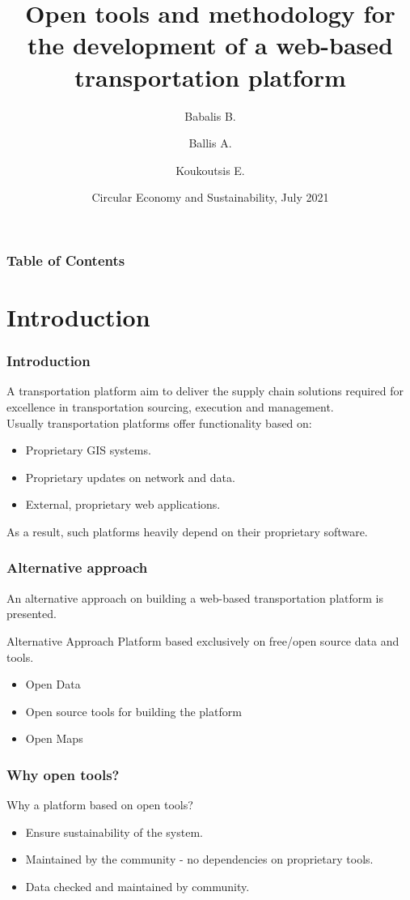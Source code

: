 \documentclass{beamer}
\title{Open tools and methodology for the development of a web-based transportation platform}
\author[Babalis B., Ballis A., Koukoutsis E.] %
{Babalis B.\inst{1} \and Ballis A.\inst{2} \and Koukoutsis E.\inst{1}}
\institute[National Technical University of Athens] %
{
  \inst{1}%
  School of Electrical and Computer Engineering\\
  National Technical University of Athens
  \and
  \inst{2}%
  School of Civil Engineering\\
  National Technical University of Athens
}
\date[CES 2021] %
{Circular Economy and Sustainability, July 2021}
\begin{document}
\frame{\titlepage}

\begin{frame}
	\frametitle{Table of Contents}
	\tableofcontents
\end{frame}

\section{Introduction}
    \begin{frame}
    \frametitle{Introduction}
    A transportation platform aim to deliver the supply chain solutions required for excellence in transportation sourcing, execution and management.\\
    Usually transportation platforms offer functionality based on:
    \begin{itemize}
    	\item Proprietary GIS systems.
    	\item Proprietary updates on network and data.
    	\item External, proprietary web applications.
    \end{itemize}
    \pause
    \checkmark As a result, such platforms heavily depend on their proprietary software.
    \end{frame}
    
    \begin{frame}
    \frametitle{Alternative approach}
    
    An alternative approach on building a web-based transportation platform is presented.
    \begin{block}{Alternative Approach}
    Platform based exclusively on free/open source data and tools.
	\end{block}

    \pause
    \begin{itemize}
        \item Open Data
        \item Open source tools for building the platform
        \item Open Maps
    \end{itemize}
    \end{frame}
    
    \begin{frame}
    \frametitle{Why open tools?}
    Why a platform based on open tools?
    
    \begin{itemize}
        \item Ensure sustainability of the system.
        \item Maintained by the community - no dependencies on proprietary tools.
        \item Data checked and maintained by community.
    \end{itemize}
    \end{frame}
\end{document}

